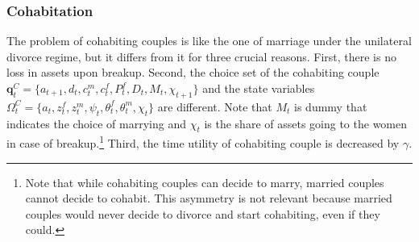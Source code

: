 \documentclass[12pt]{article}
\numberwithin{table}{section}
\begin{document}
\subsubsection*{Cohabitation}
The problem of cohabiting couples is like the one of marriage under the unilateral divorce regime, but it differs from it for three crucial reasons. First, there is no loss in assets upon breakup. Second, the choice set of the cohabiting couple $\mathbf{q}^C_t=\{a_{t+1},d_t,c^m_t,c^f_t,P^f_t,D_t,M_t,\chi_{t+1}\}$ and the state variables $\Omega^{C}_t=\{a_t,z^f_t,z^m_t,\psi_t,\theta^f_t,\theta^m_t,\chi_t\}$ are different. Note that $M_t$ is dummy that indicates the choice of marrying and $\chi_t$ is the share of assets going to the women in case of breakup.\footnote{Note that while cohabiting couples can decide to marry, married couples cannot decide to cohabit. This asymmetry is not relevant because married couples would never decide to divorce and start cohabiting, even if they could.} Third, the time utility of cohabiting couple is decreased by $\gamma$.
\end{document}
